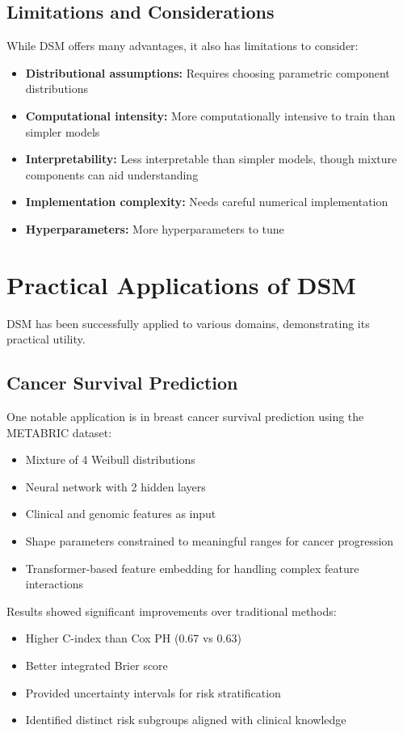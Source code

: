 \subsection{Limitations and Considerations}

While DSM offers many advantages, it also has limitations to consider:
\begin{itemize}
    \item \textbf{Distributional assumptions:} Requires choosing parametric component distributions
    \item \textbf{Computational intensity:} More computationally intensive to train than simpler models
    \item \textbf{Interpretability:} Less interpretable than simpler models, though mixture components can aid understanding
    \item \textbf{Implementation complexity:} Needs careful numerical implementation
    \item \textbf{Hyperparameters:} More hyperparameters to tune
\end{itemize}

\section{Practical Applications of DSM}

DSM has been successfully applied to various domains, demonstrating its practical utility.

\subsection{Cancer Survival Prediction}

One notable application is in breast cancer survival prediction using the METABRIC dataset:
\begin{itemize}
    \item Mixture of 4 Weibull distributions
    \item Neural network with 2 hidden layers
    \item Clinical and genomic features as input
    \item Shape parameters constrained to meaningful ranges for cancer progression
    \item Transformer-based feature embedding for handling complex feature interactions
\end{itemize}

Results showed significant improvements over traditional methods:
\begin{itemize}
    \item Higher C-index than Cox PH (0.67 vs 0.63)
    \item Better integrated Brier score
    \item Provided uncertainty intervals for risk stratification
    \item Identified distinct risk subgroups aligned with clinical knowledge
\end{itemize}


